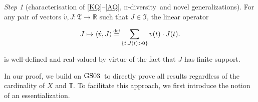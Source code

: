 \documentclass[ecta,nameyear,draft]{econsocart}
\newcommand{\countof}{\mathbin{\#}\hskip1pt}
\newcommand{\R}{\mathbb R}
\newcommand\defeq{\mathrel{\overset{\makebox[0pt]{\mbox{\normalfont\tiny def}}}{=}}}%
\newcommand{\mbbt}{{\mathds {T}}}
\newcommand{\mbbtpp}{{\mathfrak{T}}}
\newcommand{\mbbjpp}{\mathfrak{I}}
\newcommand{\twodiv}{\textsc{ii}-\textup{diversity}}
\newcommand{\gsii}{$\textup{GS03}$}
\theoremstyle{plain}
\theoremstyle{remark}
\newtheorem{step}{Step}[section]
\begin{document}
\begin{appendix}
    \begin{step}[characterisation of \ref{KQ}–\ref{AQ}, \twodiv\ and novel
      generalizations]\label{step-twodiv}
    For any pair of vectors $\acute v, J: \mbbtpp \rightarrow \R$ such that $J
    \in \mbbjpp$, the linear operator
    \begin{linenomath*}
      \begin{equation*}
        J \mapsto \langle \acute v, J \rangle \defeq \sum_{\{t : J(t) > 0\}} v(t)
        \cdot J(t).
      \end{equation*}
    \end{linenomath*}
    is well-defined and real-valued by virtue of the fact that $J$ has finite
    support.

    In our proof, we build on \gsii\ to directly prove all results regardless of
    the cardinality of $X$ and $\mbbt$. To facilitate this approach, we first 
    introduce the notion of an essentialization.


\end{step}
\end{appendix}
\end{document}
